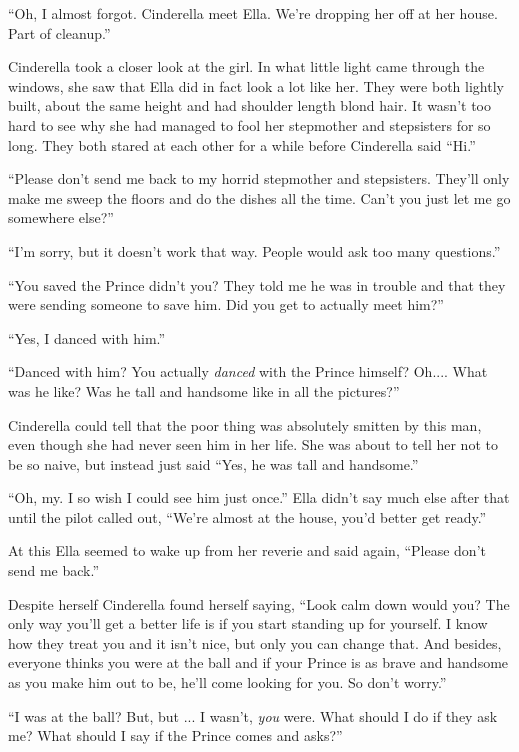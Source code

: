 \documentclass[11pt,letterpaper]{article}
\begin{document}
``Oh, I almost forgot. Cinderella meet Ella. We're dropping her off at her house. Part of cleanup.''

Cinderella took a closer look at the girl. In what little light came through the windows, she saw that Ella did in fact look a lot like her. They were both lightly built, about the same height and had shoulder length blond hair. It wasn't too hard to see why she had managed to fool her stepmother and stepsisters for so long. They both stared at each other for a while before Cinderella said ``Hi.''

``Please don't send me back to my horrid stepmother and stepsisters. They'll only make me sweep the floors and do the dishes all the time. Can't you just let me go somewhere else?''

``I'm sorry, but it doesn't work that way. People would ask too many questions.''

``You saved the Prince didn't you? They told me he was in trouble and that they were sending someone to save him. Did you get to actually meet him?''

``Yes, I danced with him.''

``Danced with him? You actually \textit{danced} with the Prince himself? Oh.... What was he like? Was he tall and handsome like in all the pictures?''

Cinderella could tell that the poor thing was absolutely smitten by this man, even though she had never seen him in her life. She was about to tell her not to be so naive, but instead just said ``Yes, he was tall and handsome.''

``Oh, my. I so wish I could see him just once.'' Ella didn't say much else after that until the pilot called out, ``We're almost at the house, you'd better get ready.''

At this Ella seemed to wake up from her reverie and said again, ``Please don't send me back.''

Despite herself Cinderella found herself saying, ``Look calm down would you? The only way you'll get a better life is if you start standing up for yourself. I know how they treat you and it isn't nice, but only you can change that.  And besides, everyone thinks you were at the ball and if your Prince is as brave and handsome as you make him out to be, he'll come looking for you. So don't worry.''

``I was at the ball? But, but ... I wasn't, \textit{you} were. What should I do if they ask me? What should I say if the Prince comes and asks?''
\end{document}
